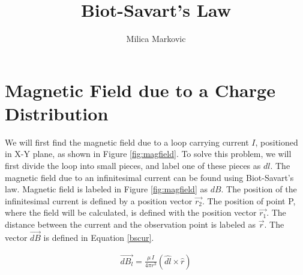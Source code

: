 \documentclass{ximera}
\title{Biot-Savart's Law}
\author{Milica Markovic}
\begin{document}
  
\begin{abstract}  

\end{abstract}  
\maketitle    


\section{Magnetic Field due to a Charge Distribution}






We will first find the magnetic field due to a loop carrying current $I$,  positioned in X-Y plane, as shown in Figure \ref{fig:magfield}. To solve this problem, we will first divide the loop into small pieces, and label one of these pieces as $dl$. The magnetic field due to an infinitesimal current can be found using Biot-Savart's law. Magnetic field is labeled in Figure \ref{fig:magfield} as $dB$.  The position of the infinitesimal current  is defined by a position vector $\vec{r_2}$. The position of point P, where the field will be calculated,  is defined with the position vector  $\vec{r_1}$. The distance between the current and the observation point is labeled as $\vec{r}$. The vector  $\vec{dB}$ is defined in  Equation  \ref{bscur}.


\begin{eqnarray}
\vec{dB_l}=\frac{\mu \,I }{4 \pi r^3} (\hat{dl} \times \hat{r})\label{bscur}
\end{eqnarray}
\end{document}
